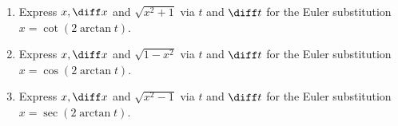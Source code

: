 \begin{enumerate}
\item Express $x, \diff x $ and $\sqrt{x^2+1}$ via $t$ and $\diff t$ for the Euler substitution $x=\cot(2\arctan t)$.
\item Express $x, \diff x $ and $\sqrt{1-x^2}$ via $t$ and $\diff t$ for the Euler substitution $x=\cos(2\arctan t)$.
\item Express $x, \diff x $ and $\sqrt{x^2-1}$ via $t$ and $\diff t$ for the Euler substitution $x=\sec(2\arctan t)$.
\end{enumerate}